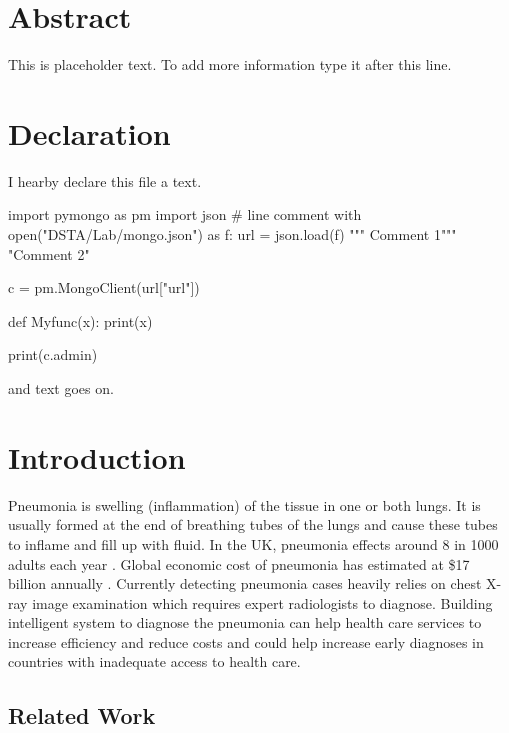 \documentclass[12pt, twoside, a4paper]{article}
\begin{document}
\section*{Abstract}
This is placeholder text. To add more information type it after this line.\\
\clearpage


\section*{Declaration}
I hearby declare this file a text.

\begin{python}
    import pymongo as pm
    import json
    # line comment
    with open("DSTA/Lab/mongo.json") as f:
    url = json.load(f)
    """ Comment 1"""
    "Comment 2"

    c = pm.MongoClient(url["url"])

    def Myfunc(x):
        print(x)

    print(c.admin)
\end{python}
and text goes on.\\
\clearpage

\tableofcontents
\thispagestyle{empty}
\clearpage

\setcounter{page}{1}


\section{Introduction}
Pneumonia is swelling (inflammation) of the tissue in one or both lungs. It is usually formed at the end of breathing tubes of the lungs and cause these tubes to inflame and fill up with fluid. In the UK, pneumonia effects around 8 in 1000 adults each year \cite{nhs}. Global economic cost of pneumonia has estimated at \$17 billion annually \cite{cost}. Currently detecting pneumonia cases heavily relies on chest X-ray image examination which requires expert radiologists to diagnose. Building intelligent system to diagnose the pneumonia can help  health care services to increase efficiency and reduce costs and could help increase early diagnoses in countries with inadequate access to health care.

\subsection{Related Work}
\end{document}
